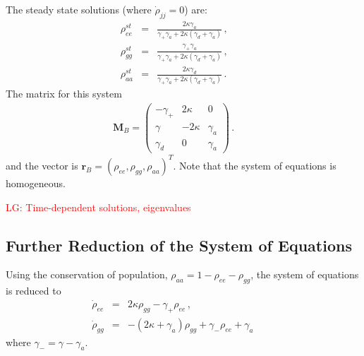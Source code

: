 \documentclass[twocolumn,aps,eqsecnum,showkeys,amsmath]{revtex4-2}
\begin{document}
The steady state solutions (where $\dot{\rho}_{jj} =0$) are: 
%
\begin{subequations}
\begin{eqnarray}
\rho_{ee}^{st} &=& \frac{ 2\kappa \gamma_a }
		{ \gamma_+ \gamma_a +2\kappa (\gamma_d +\gamma_a) } \,, \\
\rho_{gg}^{st} &=& \frac{ \gamma_+ \gamma_a }
		{ \gamma_+ \gamma_a +2\kappa (\gamma_d +\gamma_a) } \,, \\ 
\rho_{aa}^{st} &=& \frac{ 2\kappa \gamma_d }
		{ \gamma_+ \gamma_a +2\kappa (\gamma_d +\gamma_a) } \,. 
		\qquad
\end{eqnarray}
\end{subequations}
The matrix for this system
%
\begin{eqnarray}
\mathbf{M}_{B} = \left( \begin{array}{ccc} 
	-\gamma_+ & 2\kappa & 0 \\ 
	\gamma & -2\kappa &\gamma_a \\
	\gamma_d & 0 & \gamma_a  \end{array}  \right) \,.  \qquad 
\end{eqnarray}
and the vector is 
$\mathbf{r}_{B} = \left( \rho_{ee}, \rho_{gg}, \rho_{aa} \right)^T$. Note 
that the system of equations is homogeneous. 

\textcolor{red}{LG: Time-dependent solutions, eigenvalues}

\subsection{Further Reduction of the System of Equations}
Using the conservation of population, $\rho_{aa} = 1- \rho_{ee} -\rho_{gg}$, 
the system of equations is reduced to 
%
\begin{subequations}
\begin{eqnarray}
\dot{\rho}_{ee} &=& 2\kappa \rho_{gg} -\gamma_+ \rho_{ee} 	\,, \\ 
\dot{\rho}_{gg} &=& -(2\kappa +\gamma_a) \rho_{gg} 
	+\gamma_- \rho_{ee} +\gamma_a  	 	\, \qquad
\end{eqnarray}
\end{subequations}
where $\gamma_- = \gamma -\gamma_a$. 
\end{document}
